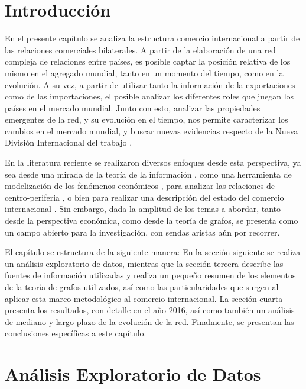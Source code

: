 \documentclass[class=article, crop=false]{standalone}
\begin{document}
\section{Introducción}

En el presente capítulo se analiza la estructura comercio internacional a partir de las relaciones comerciales bilaterales. A partir de la elaboración de una red compleja de relaciones entre países, es posible captar la posición relativa de los mismo en el agregado mundial, tanto en un momento del tiempo, como en la evolución. A su vez, a partir de utilizar tanto la información de la exportaciones como de las importaciones, el posible analizar los diferentes roles que juegan los países en el mercado mundial. Junto con esto, analizar las propiedades emergentes de la red, y su evolución en el tiempo, nos permite caracterizar los cambios en el mercado mundial, y buscar nuevas evidencias respecto de la Nueva División Internacional del trabajo \citep{frobel1978new}.

En la literatura reciente se realizaron diversos enfoques desde esta perspectiva, ya sea desde una mirada de la teoría de la información \cite{Bhattacharya2008},  como una herramienta de modelización de los fenómenos económicos \cite{Fan2014}, para analizar las relaciones de centro-periferia \cite{Fagiolo2010}, o bien para realizar una descripción del estado del comercio internacional \cite{Chow2013}. Sin embargo, dada la amplitud de los temas a abordar, tanto desde la perspectiva económica, como desde la teoría de grafos, se presenta como un campo abierto para la investigación, con sendas aristas aún por recorrer.        

El capítulo se estructura de la siguiente manera: En la sección siguiente se realiza un análisis exploratorio de datos, mientras que la sección tercera describe las fuentes de información utilizadas y realiza un pequeño resumen de los elementos de la teoría de grafos utilizados, así como las particularidades que surgen al aplicar esta marco metodológico al comercio internacional. La sección cuarta presenta los resultados, con detalle en el año 2016, así como también un análisis de mediano y largo plazo de la evolución de la red. Finalmente, se presentan las conclusiones específicas a este capítulo.


\section{Análisis Exploratorio de Datos}
\end{document}
